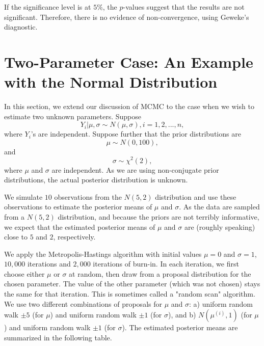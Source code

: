 \documentclass[12pt,openany]{article}
\theoremstyle{remark} %
\theoremstyle{definition} %
\begin{document}
\bigskip
If the significance level is at $5\%$, the $p$-values suggest that the results are not significant. Therefore, there is no evidence of non-convergence, using Geweke's diagnostic. 



\section{Two-Parameter Case: An Example with the Normal Distribution}

In this section, we extend our discussion of MCMC to the case when we wish to estimate two unknown parameters. Suppose 
\[ Y_i|\mu,\sigma \sim N(\mu,\sigma), i = 1,2,...,n,\]
where $Y_i$'s are independent. Suppose further that the prior distributions are
\[ \mu \sim N(0,100),\]
and 
\[ \sigma \sim \chi^2(2),\]
where $\mu$ and $\sigma$ are independent. As we are using non-conjugate prior distributions, the actual posterior distribution is unknown.

We simulate $10$ observations from the $N(5,2)$ distribution and use these observations to estimate the posterior means of $\mu$ and $\sigma$. As the data are sampled from a $N(5,2)$ distribution, and because the priors are not terribly informative, we expect that the estimated posterior means of $\mu$ and $\sigma$ are (roughly speaking) close to $5$ and $2$, respectively. 

We apply the Metropolis-Hastings algorithm with initial values $\mu = 0$ and $\sigma = 1$, $10,000$ iterations and $2,000$ iterations of burn-in. In each iteration, we first choose either $\mu$ or $\sigma$ at random, then draw from a proposal distribution for the chosen parameter. The value of the other parameter (which was not chosen) stays the same for that iteration. This is sometimes called a "random scan" algorithm. We use two different combinations of proposals for $\mu$ and $\sigma$: a) uniform random walk $\pm 5$ (for $\mu$) and uniform random walk $\pm 1$ (for $\sigma$), and b) $N(\mu^{(i)},1)$ (for $\mu$) and uniform random walk $\pm 1$ (for $\sigma$). The estimated posterior means are summarized in the following table.
\end{document}
